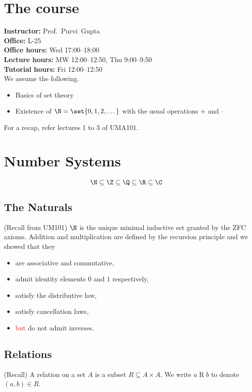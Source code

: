 
\setcounter{section}{-1}
\section{The course} \label{sec:course}
\textbf{Instructor:} Prof.~Purvi~Gupta\\
\textbf{Office:} L-25\\
\textbf{Office hours:} Wed 17:00--18:00\\
\textbf{Lecture hours:} MW 12:00--12:50, Thu 9:00--9:50\\
\textbf{Tutorial hours:} Fri 12:00--12:50\\

We assume the following.
\begin{itemize}
    \item Basics of set theory
    \item Existence of $\N = \set{0, 1, 2, \dots}$ with the usual operations
    $+$ and $\cdot$
\end{itemize}
For a recap, refer lectures 1 to 3 of UMA101.

\section{Number Systems} \label{sec:number_systems}
\[
    \N \subseteq \Z \subseteq \Q \subseteq \R \subseteq \C
\]
\subsection{The Naturals} \label{sec:naturals}
(Recall from UM101) $\N$ is the unique minimal inductive set granted by the ZFC
axioms.
Addition and multiplication are defined by the recursion principle and we showed
that they
\begin{itemize}
    \item are associative and commutative,
    \item admit identity elements $0$ and $1$ respectively,
    \item satisfy the distributive law,
    \item satisfy cancellation laws,
    \item \textcolor{Red}{but} do not admit inverses.
\end{itemize}

\subsection{Relations} \label{sec:relations}
(Recall) A relation on a set $A$ is a subset $R \subseteq A \times A$.
We write $a \mathrel{R} b$ to denote $(a, b) \in R$.

